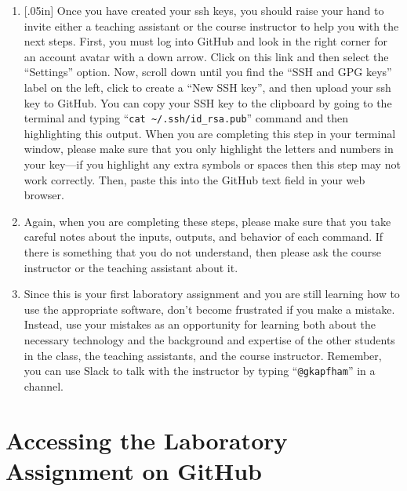 \documentclass[11pt]{article}
\newcommand{\command}[1]{``\lstinline{#1}''}
\newcommand{\caution}[1]{\null\hfill\LARGE{\faWarning{}}\newline\scriptsize{\em{#1}}}
\begin{document}
\begin{enumerate}
  \item \marginnote{\caution{Upload keys correctly}}[.05in] Once you have
    created your ssh keys, you should raise your hand to invite either a
    teaching assistant or the course instructor to help you with the next
    steps. First, you must log into GitHub and look in the right corner for an
    account avatar with a down arrow. Click on this link and then select the
    ``Settings'' option. Now, scroll down until you find the ``SSH and GPG
    keys'' label on the left, click to create a ``New SSH key'', and then
    upload your ssh key to GitHub. You can copy your SSH key to the clipboard
    by going to the terminal and typing ``{\tt cat
    \textasciitilde{}/.ssh/id\_rsa.pub}'' command and then highlighting this
    output. When you are completing this step in your terminal window, please
    make sure that you only highlight the letters and numbers in your key---if
    you highlight any extra symbols or spaces then this step may not work
    correctly. Then, paste this into the GitHub text field in your web browser.

  \item Again, when you are completing these steps, please make sure that you
    take careful notes about the inputs, outputs, and behavior of each command.
    If there is something that you do not understand, then please ask the
    course instructor or the teaching assistant about it.

  \item Since this is your first laboratory assignment and you are still
    learning how to use the appropriate software, don't become frustrated if
    you make a mistake. Instead, use your mistakes as an opportunity for
    learning both about the necessary technology and the background and
    expertise of the other students in the class, the teaching assistants, and
    the course instructor. Remember, you can use Slack to talk with the
    instructor by typing \command{@gkapfham} in a channel.

\end{enumerate}

\section*{Accessing the Laboratory Assignment on GitHub}
\end{document}
